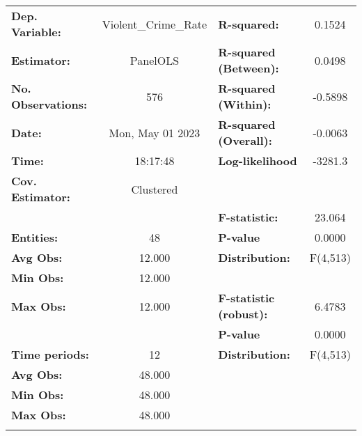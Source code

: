 \begin{center}
\begin{tabular}{lclc}
\toprule
\textbf{Dep. Variable:}       & Violent\_Crime\_Rate & \textbf{  R-squared:         }   &      0.1524      \\
\textbf{Estimator:}           &       PanelOLS       & \textbf{  R-squared (Between):}  &      0.0498      \\
\textbf{No. Observations:}    &         576          & \textbf{  R-squared (Within):}   &     -0.5898      \\
\textbf{Date:}                &   Mon, May 01 2023   & \textbf{  R-squared (Overall):}  &     -0.0063      \\
\textbf{Time:}                &       18:17:48       & \textbf{  Log-likelihood     }   &     -3281.3      \\
\textbf{Cov. Estimator:}      &      Clustered       & \textbf{                     }   &                  \\
\textbf{}                     &                      & \textbf{  F-statistic:       }   &      23.064      \\
\textbf{Entities:}            &          48          & \textbf{  P-value            }   &      0.0000      \\
\textbf{Avg Obs:}             &        12.000        & \textbf{  Distribution:      }   &     F(4,513)     \\
\textbf{Min Obs:}             &        12.000        & \textbf{                     }   &                  \\
\textbf{Max Obs:}             &        12.000        & \textbf{  F-statistic (robust):} &      6.4783      \\
\textbf{}                     &                      & \textbf{  P-value            }   &      0.0000      \\
\textbf{Time periods:}        &          12          & \textbf{  Distribution:      }   &     F(4,513)     \\
\textbf{Avg Obs:}             &        48.000        & \textbf{                     }   &                  \\
\textbf{Min Obs:}             &        48.000        & \textbf{                     }   &                  \\
\textbf{Max Obs:}             &        48.000        & \textbf{                     }   &                  \\
\textbf{}                     &                      & \textbf{                     }   &                  \\

\end{tabular}
\end{center}
